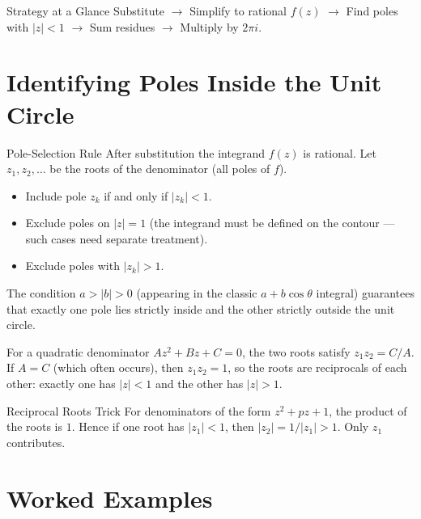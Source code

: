 \documentclass[12pt,a4paper]{article}
\begin{document}
\begin{learnbox}{Strategy at a Glance}
Substitute $\to$ Simplify to rational $f(z)$ $\to$ Find poles with $|z|<1$
$\to$ Sum residues $\to$ Multiply by $2\pi i$.
\end{learnbox}

\section{Identifying Poles Inside the Unit Circle}

\begin{infobox}{Pole-Selection Rule}
After substitution the integrand $f(z)$ is rational. Let $z_1, z_2, \ldots$
be the roots of the denominator (all poles of $f$).
\begin{itemize}
  \item Include pole $z_k$ if and only if $|z_k| < 1$.
  \item Exclude poles on $|z| = 1$ (the integrand must be defined on the
        contour --- such cases need separate treatment).
  \item Exclude poles with $|z_k| > 1$.
\end{itemize}
The condition $a > |b| > 0$ (appearing in the classic $a + b\cos\theta$
integral) guarantees that exactly one pole lies strictly inside and the other
strictly outside the unit circle.
\end{infobox}

For a quadratic denominator $Az^2 + Bz + C = 0$, the two roots satisfy
$z_1 z_2 = C/A$. If $A = C$ (which often occurs), then $z_1 z_2 = 1$, so
the roots are reciprocals of each other: exactly one has $|z| < 1$ and the
other has $|z| > 1$.

\begin{learnbox}{Reciprocal Roots Trick}
For denominators of the form $z^2 + pz + 1$, the product of the roots is $1$.
Hence if one root has $|z_1| < 1$, then $|z_2| = 1/|z_1| > 1$. Only $z_1$
contributes.
\end{learnbox}

\section{Worked Examples}
\end{document}

